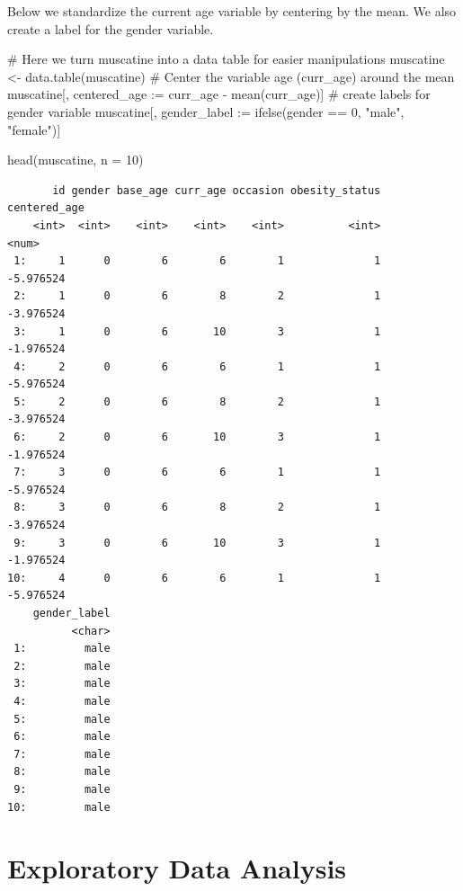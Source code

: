 \documentclass[
  letterpaper,
  DIV=11,
  numbers=noendperiod]{scrreprt}
\newenvironment{Shaded}{\begin{snugshade}}{\end{snugshade}}
\newcommand{\AttributeTok}[1]{\textcolor[rgb]{0.40,0.45,0.13}{#1}}
\newcommand{\CommentTok}[1]{\textcolor[rgb]{0.37,0.37,0.37}{#1}}
\newcommand{\DecValTok}[1]{\textcolor[rgb]{0.68,0.00,0.00}{#1}}
\newcommand{\ErrorTok}[1]{\textcolor[rgb]{0.68,0.00,0.00}{#1}}
\newcommand{\FunctionTok}[1]{\textcolor[rgb]{0.28,0.35,0.67}{#1}}
\newcommand{\NormalTok}[1]{\textcolor[rgb]{0.00,0.23,0.31}{#1}}
\newcommand{\OtherTok}[1]{\textcolor[rgb]{0.00,0.23,0.31}{#1}}
\newcommand{\SpecialCharTok}[1]{\textcolor[rgb]{0.37,0.37,0.37}{#1}}
\newcommand{\StringTok}[1]{\textcolor[rgb]{0.13,0.47,0.30}{#1}}
\begin{document}
Below we standardize the current age variable by centering by the mean.
We also create a label for the gender variable.

\begin{Shaded}
\begin{Highlighting}[]
\CommentTok{\# Here we turn muscatine into a data table for easier manipulations}
\NormalTok{muscatine }\OtherTok{\textless{}{-}} \FunctionTok{data.table}\NormalTok{(muscatine)}
\CommentTok{\# Center the variable age (curr\_age) around the mean}
\NormalTok{muscatine[, centered\_age }\SpecialCharTok{:}\ErrorTok{=}\NormalTok{ curr\_age }\SpecialCharTok{{-}} \FunctionTok{mean}\NormalTok{(curr\_age)]}
\CommentTok{\# create labels for gender variable}
\NormalTok{muscatine[, gender\_label }\SpecialCharTok{:}\ErrorTok{=} \FunctionTok{ifelse}\NormalTok{(gender }\SpecialCharTok{==} \DecValTok{0}\NormalTok{, }\StringTok{"male"}\NormalTok{, }\StringTok{"female"}\NormalTok{)]}

\FunctionTok{head}\NormalTok{(muscatine, }\AttributeTok{n =} \DecValTok{10}\NormalTok{)}
\end{Highlighting}
\end{Shaded}

\begin{verbatim}
       id gender base_age curr_age occasion obesity_status centered_age
    <int>  <int>    <int>    <int>    <int>          <int>        <num>
 1:     1      0        6        6        1              1    -5.976524
 2:     1      0        6        8        2              1    -3.976524
 3:     1      0        6       10        3              1    -1.976524
 4:     2      0        6        6        1              1    -5.976524
 5:     2      0        6        8        2              1    -3.976524
 6:     2      0        6       10        3              1    -1.976524
 7:     3      0        6        6        1              1    -5.976524
 8:     3      0        6        8        2              1    -3.976524
 9:     3      0        6       10        3              1    -1.976524
10:     4      0        6        6        1              1    -5.976524
    gender_label
          <char>
 1:         male
 2:         male
 3:         male
 4:         male
 5:         male
 6:         male
 7:         male
 8:         male
 9:         male
10:         male
\end{verbatim}

\hypertarget{exploratory-data-analysis}{%
\section{Exploratory Data Analysis}\label{exploratory-data-analysis}}
\end{document}
